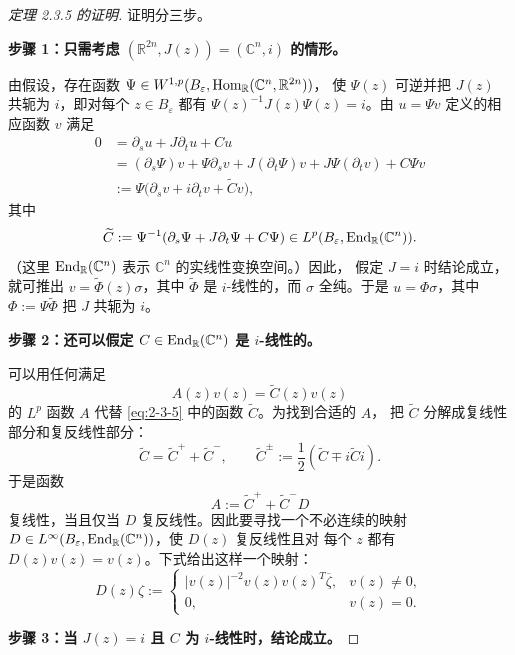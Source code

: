 \begin{proof}[定理 2.3.5 的证明]
证明分三步。

\medskip\noindent
\textbf{步骤 1：只需考虑
$(\mathbb R^{2n},J(z))=(\mathbb C^n,i)$ 的情形。}

由假设，存在函数
$\Psi\in W^{1,p}(B_\varepsilon,\operatorname{Hom}_{\mathbb R}(\mathbb C^n,\mathbb R^{2n}))$，
使 $\Psi(z)$ 可逆并把 $J(z)$ 共轭为 $i$，即对每个 $z\in B_\varepsilon$ 都有
$\Psi(z)^{-1}J(z)\Psi(z)=i$。由 $u=\Psi v$ 定义的相应函数 $v$ 满足
\begin{align*}
  0
  &=\partial_su+J\partial_tu+Cu\\
  &=(\partial_s\Psi)v+\Psi\partial_sv+J(\partial_t\Psi)v
    +J\Psi(\partial_tv)+C\Psi v\\
  &:=\Psi\bigl(\partial_sv+i\partial_tv+\widetilde Cv\bigr),
\end{align*}
其中
\begin{equation}\label{eq:2-3-5}
  \widetilde C:=
  \Psi^{-1}(\partial_s\Psi+J\partial_t\Psi+C\Psi)
  \in L^p(B_\varepsilon,\operatorname{End}_{\mathbb R}(\mathbb C^n)).
\end{equation}
（这里 $\operatorname{End}_{\mathbb R}(\mathbb C^n)$ 表示 $\mathbb C^n$ 的实线性变换空间。）因此，
假定 $J=i$ 时结论成立，就可推出 $v=\widetilde\Phi(z)\sigma$，其中
$\widetilde\Phi$ 是 $i$-线性的，而 $\sigma$ 全纯。于是
$u=\Phi\sigma$，其中 $\Phi:=\Psi\widetilde\Phi$ 把 $J$ 共轭为 $i$。

\medskip\noindent
\textbf{步骤 2：还可以假定 $C\in\operatorname{End}_{\mathbb R}(\mathbb C^n)$ 是 $i$-线性的。}

可以用任何满足
\[
  A(z)v(z)=\widetilde C(z)v(z)
\]
的 $L^p$ 函数 $A$ 代替 \eqref{eq:2-3-5} 中的函数 $\widetilde C$。为找到合适的 $A$，
把 $\widetilde C$ 分解成复线性部分和复反线性部分：
\[
  \widetilde C=\widetilde C^++\widetilde C^-,
  \qquad
  \widetilde C^\pm:=\frac12(\widetilde C\mp i\widetilde C i).
\]
于是函数
\[
  A:=\widetilde C^++\widetilde C^-D
\]
复线性，当且仅当 $D$ 复反线性。因此要寻找一个不必连续的映射
$D\in L^\infty(B_\varepsilon,\operatorname{End}_{\mathbb R}(\mathbb C^n))$，使 $D(z)$ 复反线性且对
每个 $z$ 都有 $D(z)v(z)=v(z)$。下式给出这样一个映射：
\[
  D(z)\zeta:=
  \begin{cases}
    |v(z)|^{-2}v(z)v(z)^T\overline\zeta,&v(z)\ne0,\\
    0,&v(z)=0.
  \end{cases}
\]

\medskip\noindent
\textbf{步骤 3：当 $J(z)=i$ 且 $C$ 为 $i$-线性时，结论成立。}


\end{proof}
